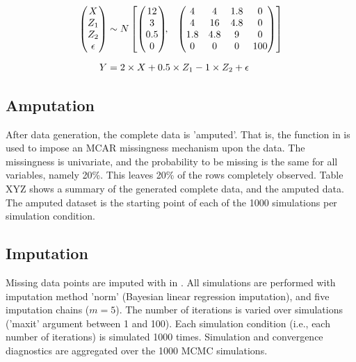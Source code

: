 \documentclass[article]{jss}
\newcommand{\fct}[1]{\code{#1()}}
\begin{document}
\begin{align*}
\begin{pmatrix}X\\
Z_{1}\\
Z_{2}\\
\epsilon
\end{pmatrix} &\sim  N
\begin{bmatrix}
\begin{pmatrix}
12\\
3\\
0.5\\
0
\end{pmatrix}\!\!,&
\begin{pmatrix}
4 & 4 & 1.8 & 0\\
4 & 16 & 4.8 & 0\\
1.8 & 4.8 & 9 & 0\\
0 & 0 & 0 & 100
\end{pmatrix}
\end{bmatrix}\\[2\jot]
Y &=  2 \times X + 0.5 \times Z_1 - 1 \times Z_2 + \epsilon
\end{align*}

\subsection{Amputation}
After data generation, the complete data is 'amputed'. That is, the  function \fct{ampute} in  is used to impose an MCAR missingness mechanism upon the data. The missingness is univariate, and the probability to be missing is the same for all variables, namely 20\%. This leaves 20\% of the rows completely observed. %
Table XYZ shows a summary of the generated complete data, and the amputed data. The amputed dataset is the starting point of each of the 1000 simulations per simulation condition.

\subsection{Imputation}
Missing data points are imputed with  in . All simulations are performed with imputation method 'norm' (Bayesian linear regression imputation), and five imputation chains ($m = 5$). The number of iterations is varied over simulations ('maxit' argument between 1 and 100). Each simulation condition (i.e., each number of iterations) is simulated 1000 times. Simulation and convergence diagnostics are aggregated over the 1000 MCMC simulations. 
\end{document}
